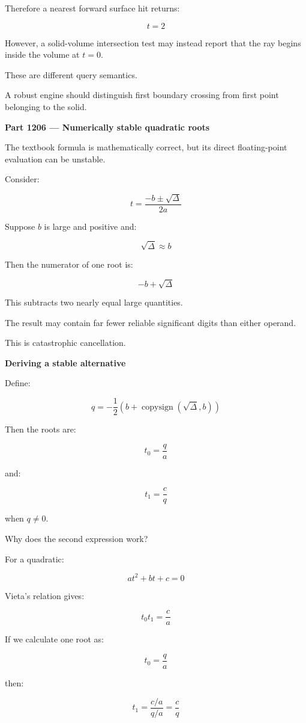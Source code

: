 Therefore a nearest forward surface hit returns:

\[
t=2
\]

However, a solid-volume intersection test may instead report that the ray begins inside the volume at \(t=0\).

These are different query semantics.

A robust engine should distinguish first boundary crossing from first point belonging to the solid.

\textbf{Part 1206 --- Numerically stable quadratic roots}

The textbook formula is mathematically correct, but its direct floating-point evaluation can be unstable.

Consider:

\[
t=\frac{-b\pm\sqrt{\Delta}}{2a}
\]

Suppose \(b\) is large and positive and:

\[
\sqrt{\Delta}\approx b
\]

Then the numerator of one root is:

\[
-b+\sqrt{\Delta}
\]

This subtracts two nearly equal large quantities.

The result may contain far fewer reliable significant digits than either operand.

This is catastrophic cancellation.

\textbf{Deriving a stable alternative}

Define:

\[
\boxed{ q=-\frac12\left(b+\operatorname{copysign}(\sqrt{\Delta},b)\right) }
\]

Then the roots are:

\[
\boxed{ t_0=\frac qa }
\]

and:

\[
\boxed{ t_1=\frac cq }
\]

when \(q\ne0\).

Why does the second expression work?

For a quadratic:

\[
at^2+bt+c=0
\]

Vieta's relation gives:

\[
t_0t_1=\frac ca
\]

If we calculate one root as:

\[
t_0=\frac qa
\]

then:

\[
t_1=\frac{c/a}{q/a}=\frac cq
\]

